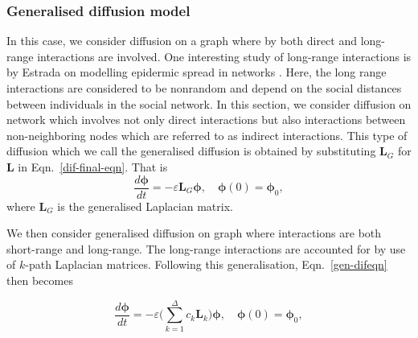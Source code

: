 \documentclass[10pt,a4paper]{article}
\theoremstyle{plain}
\theoremstyle{definition}
\begin{document}
        
        \subsubsection{Generalised diffusion model}
        In this case, we consider diffusion on a graph where by both direct and long-range interactions are involved. One interesting study of long-range interactions is by Estrada on modelling epidermic spread in networks \citep{estrada2011epidemic}. Here, the long range interactions are considered to be nonrandom and depend on the social distances between individuals in the social network.
        In this section, we consider diffusion on network which involves not only direct interactions but also interactions between non-neighboring nodes which are referred to as indirect interactions.
        This type of diffusion which we call the generalised diffusion is obtained by substituting $\mathbf{L}_G$ for $\mathbf{L}$ in Eqn.~\ref{dif-final-eqn}. That is 
        \begin{equation}
        \frac{d\boldsymbol{\phi}}{dt} = -\varepsilon \mathbf{L}_{G}\boldsymbol{\phi}, \quad \boldsymbol{\phi}(0) = \boldsymbol{\phi}_0 ,
        \label{gen-difeqn}
        \end{equation}
        where $\mathbf{L}_G$ is the generalised Laplacian matrix. 
        
        
        We then consider generalised diffusion on graph where interactions are both short-range and long-range. The long-range interactions are accounted for by use of $k$-path Laplacian matrices. Following this generalisation, Eqn.~\ref{gen-difeqn} then becomes
        
        \begin{equation}
        \frac{d\boldsymbol{\phi}}{dt} =  -\varepsilon \Big(\sum_{k=1}^{\Delta}c_k\mathbf{L}_{k} \Big) \boldsymbol{\phi}, \quad \boldsymbol{\phi}(0) = \boldsymbol{\phi}_0 ,
        \label{kgen-difeqn}
        \end{equation}
        
\end{document}
